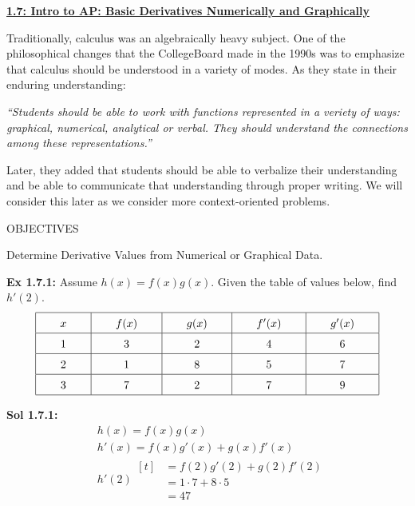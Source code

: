 \textbf{\underline{\large{1.7: Intro to AP: Basic Derivatives Numerically and Graphically}}} \par

Traditionally, calculus was an algebraically heavy subject. One of the philosophical changes that the CollegeBoard made in the 1990s was to emphasize that calculus should be understood in a variety of modes. As they state in their enduring understanding: \begin{center}
    \parbox{0.8\textwidth}{\textit{
       ``Students should be able to work with functions represented in a veriety of ways: graphical, numerical, analytical or verbal.  They should understand the connections among these representations.''}
    }
\end{center} \par

Later, they added that students should be able to verbalize their understanding and be able to communicate that understanding through proper writing. We will consider this later as we consider more context-oriented problems. \par

\begin{tcolorbox}[objective]
    \begin{center}
        OBJECTIVES \\[11pt]
    \end{center}
    Determine Derivative Values from Numerical or Graphical Data.
\end{tcolorbox} \vspace{11pt}

\begin{tcolorbox}[example]
    \textbf{Ex 1.7.1: } Assume $h(x) = f(x)g(x)$. Given the table of values below, find $h'(2)$. \begin{align*}
        \arraycolsep=22pt\def\arraystretch{1.5}
        \begin{array}{|c|c|c|c|c|}
            \hline
            x & f(x) & g(x) & f'(x) & g'(x) \\ \hline
            1 & 3 & 2 & 4 & 6 \\ \hline
            2 & 1 & 8 & 5 & 7 \\ \hline
            3 & 7 & 2 & 7 & 9 \\
            \hline
        \end{array}
    \end{align*}
\end{tcolorbox}
\begin{tcolorbox}[solution]
    \textbf{Sol 1.7.1: } \begin{align*}
        & h(x) = f(x)g(x) \\[11pt]
        & h'(x) = f(x)g'(x) + g(x)f'(x) \\[11pt]
        & h'(2) \begin{aligned}[t]
            & = f(2)g'(2) + g(2)f'(2) \\[11pt]
            & = 1 \cdot 7 + 8 \cdot 5 \\[11pt]
            & = \boxed{47}
        \end{aligned}
    \end{align*}
\end{tcolorbox} \vspace{11pt}

